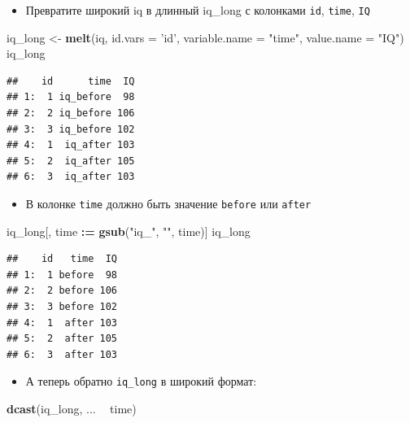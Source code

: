 \documentclass[]{book}
\newenvironment{Shaded}{\begin{snugshade}}{\end{snugshade}}
\newcommand{\KeywordTok}[1]{\textcolor[rgb]{0.13,0.29,0.53}{\textbf{#1}}}
\newcommand{\DataTypeTok}[1]{\textcolor[rgb]{0.13,0.29,0.53}{#1}}
\newcommand{\StringTok}[1]{\textcolor[rgb]{0.31,0.60,0.02}{#1}}
\newcommand{\OperatorTok}[1]{\textcolor[rgb]{0.81,0.36,0.00}{\textbf{#1}}}
\newcommand{\ErrorTok}[1]{\textcolor[rgb]{0.64,0.00,0.00}{\textbf{#1}}}
\newcommand{\NormalTok}[1]{#1}
\providecommand{\tightlist}{%
  \setlength{\itemsep}{0pt}\setlength{\parskip}{0pt}}
\begin{document}
\begin{itemize}
\tightlist
\item
  Превратите широкий iq в длинный iq\_long с колонками \texttt{id},
  \texttt{time}, \texttt{IQ}
\end{itemize}

\begin{Shaded}
\begin{Highlighting}[]
\NormalTok{iq_long <-}\StringTok{ }\KeywordTok{melt}\NormalTok{(iq, }\DataTypeTok{id.vars =} \StringTok{'id'}\NormalTok{, }\DataTypeTok{variable.name =} \StringTok{"time"}\NormalTok{, }\DataTypeTok{value.name =} \StringTok{"IQ"}\NormalTok{)}
\NormalTok{iq_long}
\end{Highlighting}
\end{Shaded}

\begin{verbatim}
##    id      time  IQ
## 1:  1 iq_before  98
## 2:  2 iq_before 106
## 3:  3 iq_before 102
## 4:  1  iq_after 103
## 5:  2  iq_after 105
## 6:  3  iq_after 103
\end{verbatim}

\begin{itemize}
\tightlist
\item
  В колонке \texttt{time} должно быть значение \texttt{before} или
  \texttt{after}
\end{itemize}

\begin{Shaded}
\begin{Highlighting}[]
\NormalTok{iq_long[, time }\OperatorTok{:}\ErrorTok{=}\StringTok{ }\KeywordTok{gsub}\NormalTok{(}\StringTok{"iq_"}\NormalTok{, }\StringTok{""}\NormalTok{, time)]}
\NormalTok{iq_long}
\end{Highlighting}
\end{Shaded}

\begin{verbatim}
##    id   time  IQ
## 1:  1 before  98
## 2:  2 before 106
## 3:  3 before 102
## 4:  1  after 103
## 5:  2  after 105
## 6:  3  after 103
\end{verbatim}

\begin{itemize}
\tightlist
\item
  А теперь обратно \texttt{iq\_long} в широкий формат:
\end{itemize}

\begin{Shaded}
\begin{Highlighting}[]
\KeywordTok{dcast}\NormalTok{(iq_long, ... }\OperatorTok{~}\StringTok{ }\NormalTok{time)}
\end{Highlighting}
\end{Shaded}
\end{document}
